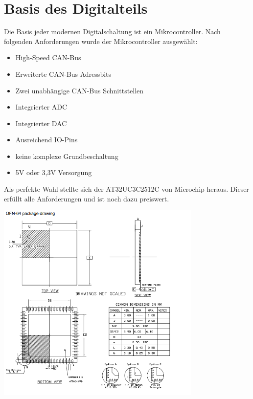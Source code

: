 \documentclass[paper=a4, 12pt]{scrreprt}
\begin{document}
	\section{Basis des Digitalteils}\hfill \break
	Die Basis jeder modernen Digitalschaltung ist ein Mikrocontroller.\hfill \break\break
	Nach folgenden Anforderungen wurde der Mikrocontroller ausgewählt:
	\hfill \break 
	\begin{center}
	\begin{minipage}{0.5\textwidth}
	\begin{itemize}
		\item High-Speed CAN-Bus
		\item Erweiterte CAN-Bus Adressbits
		\item Zwei unabhängige CAN-Bus Schnittstellen
		\item Integrierter ADC
		\item Integrierter DAC
		\item Ausreichend IO-Pins
		\item keine komplexe Grundbeschaltung
		\item 5V oder 3,3V Versorgung
	\end{itemize}
	\end{minipage}
	\end{center}
	\hfill \break
	Als perfekte Wahl stellte sich der AT32UC3C2512C von Microchip heraus. Dieser erfüllt alle Anforderungen und ist noch dazu preiswert.
	\hfill \break
	\begin{adjustbox}{center,caption={AT32UC3C2512C im QFN-64 Package},label={fig:uC Package},nofloat=figure,vspace=\bigskipamount}
		\includegraphics[height=10cm]{img/AT32UC3C2512C.png}
		\hfill \break
	\end{adjustbox}
	\pagebreak
		
\end{document}
